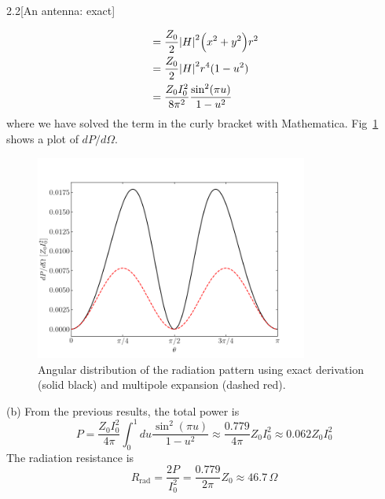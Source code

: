 \documentclass[12pt]{article}
\begin{document}
\begin{problem}{2.2}[An antenna: exact]
\begin{solution}
\begin{align}
    &=\frac{Z_0}{2}\abs{H}^2\qty(x^2+y^2)r^2\notag\\
    &=\frac{Z_0}{2}\abs{H}^2r^4(1-u^2)\notag\\
    &=\frac{Z_0I_0^2}{8\pi^2}\frac{\sin^2(\pi u)}{1-u^2}
\end{align}
where we have solved the term in the curly bracket with Mathematica.
Fig~\ref{fig:p2} shows a plot of $dP/d\Omega$.
\begin{figure}[H]
    \centering
    \includegraphics[width=0.8\textwidth]{p2.png}
    \caption{Angular distribution of the radiation pattern using exact
    derivation (solid black) and multipole expansion (dashed red).}
    \label{fig:p2}
\end{figure}

(b) From the previous results, the total power is
\begin{equation}
    P=\frac{Z_0I_0^2}{4\pi}\int_0^1du\frac{\sin^2(\pi u)}{1-u^2} 
    \approx \frac{0.779}{4\pi}Z_0I_0^2
    \approx 0.062 Z_0I_0^2
\end{equation}
The radiation resistance is
\begin{equation}
    R_\text{rad}=\frac{2P}{I_0^2}
    =\frac{0.779}{2\pi}Z_0\approx46.7\,\unit{\Omega}
\end{equation}
\end{solution}
\end{problem}
\newpage
\end{document}
